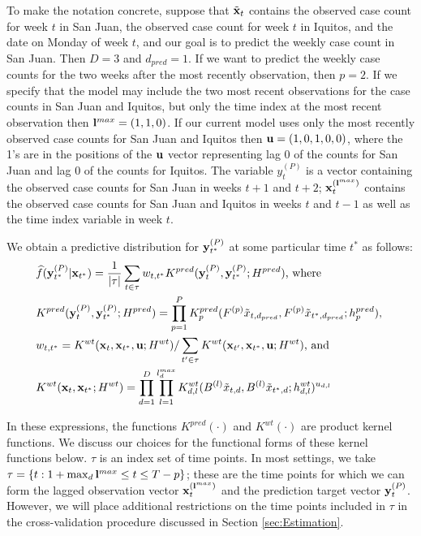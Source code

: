 \documentclass[fleqn]{article}\usepackage[]{graphicx}\usepackage[]{color}
\begin{document}
To make the notation concrete, suppose that $\tilde{{\bf x}}_t$ contains the observed case count for week $t$ in San Juan, the observed case count for week $t$ in Iquitos, and the date on Monday of week $t$, and our goal is to predict the weekly case count in San Juan.  Then $D = 3$ and $d_{pred} = 1$.  If we want to predict the weekly case counts for the two weeks after the most recently observation, then $p = 2$.  If we specify that the model may include the two most recent observations for the case counts in San Juan and Iquitos, but only the time index at the most recent observation then ${\bf l}^{max} = (1, 1, 0)$.  If our current model uses only the most recently observed case counts for San Juan and Iquitos then ${\bf u} = (1, 0, 1, 0, 0)$, where the 1's are in the positions of the ${\bf u}$ vector representing lag 0 of the counts for San Juan and lag 0 of the counts for Iquitos.  The variable $y_t^{(P)}$ is a vector containing the observed case counts for San Juan in weeks $t + 1$ and $t + 2$; ${\bf x}_t^{({\bf l}^{max})}$ contains the observed case counts for San Juan and Iquitos in weeks $t$ and $t - 1$ as well as the time index variable in week $t$.

We obtain a predictive distribution for ${\bf y}_{t^*}^{(P)}$ at some particular time $t^*$ as follows:
\begin{align}
&\widehat{f}({\bf y}_{t^*}^{(P)} | {\bf x}_{t^*}) = \frac{1}{\vert \tau \vert} \sum_{t \in \tau} w_{t, t^*} K^{pred}({\bf y}_t^{(P)}, {\bf y}_{t^*}^{(P)} ; H^{pred}) \text{, where} \label{eqn:PredLine1} \\
&K^{pred}({\bf y}_t^{(P)}, {\bf y}_{t^*}^{(P)} ; H^{pred}) = \prod_{p = 1}^P K^{pred}_p (F^{(p)} \tilde{x}_{t, d_{pred}}, F^{(p)} \tilde{x}_{t^*, d_{pred}} ; h^{pred}_p) \text{, } \label{eqn:PredLine2} \\
&w_{t, t^*} = K^{wt}({\bf x}_t,  {\bf x}_{t^*}, {\bf u} ;  H^{wt} ) / \sum_{t' \in \tau} K^{wt}({\bf x}_{t'},  {\bf x}_{t^*}, {\bf u} ;  H^{wt} ) \text{, and} \label{eqn:PredLine3} \\
&K^{wt}({\bf x}_t, {\bf x}_{t^*} ; H^{wt}) = \prod_{d = 1}^D \prod_{l = 1}^{l^{max}_d} K^{wt}_{d,l} ( B^{(l)} \tilde{x}_{t, d}, B^{(l)} \tilde{x}_{t^*, d} ; h^{wt}_{d,l})^{u_{d,l}} \label{eqn:PredLine4}
\end{align}

In these expressions, the functions $K^{pred}(\cdot)$ and $K^{wt}(\cdot)$ are product kernel functions.  We discuss our choices for the functional forms of these kernel functions below.  $\tau$ is an index set of time points.  In most settings, we take $\tau = \{t: 1 + \max_d {\bf l}^{max} \leq t \leq T - p\}$; these are the time points for which we can form the lagged observation vector ${\bf x}_t^{({\bf l}^{max})}$ and the prediction target vector ${\bf y}_t^{(P)}$.  However, we will place additional restrictions on the time points included in $\tau$ in the cross-validation procedure discussed in Section \ref{sec:Estimation}.
\end{document}
